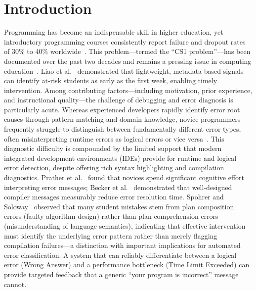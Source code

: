 \documentclass[acmsmall]{acmart}
\begin{document}
\maketitle

\section{Introduction}

Programming has become an indispensable skill in higher education, yet
introductory programming courses consistently report failure and dropout rates
of 30\% to 40\% worldwide~\cite{bennedsen2007failure,watson2014failure}. This
problem---termed the ``CS1 problem''---has been
documented over the past two decades and remains a pressing
issue in computing education~\cite{pears2007survey,liao2016lightweight}. Liao et al.~\cite{liao2016lightweight} demonstrated that lightweight, metadata-based
signals can identify at-risk students as early as the first week, enabling timely intervention. Among contributing
factors---including motivation, prior experience,
and instructional quality---the challenge of debugging and error diagnosis is
particularly acute. Whereas experienced developers rapidly identify
error root causes through pattern matching and domain knowledge, novice
programmers frequently struggle to distinguish between fundamentally different
error types, often misinterpreting runtime errors as logical errors or vice
versa~. This diagnostic difficulty is compounded by
the limited support that modern integrated development environments (IDEs)
provide for runtime and logical error detection, despite offering rich
syntax highlighting and compilation diagnostics. Prather et al.~\cite{prather2017novices} found that novices spend significant cognitive effort
interpreting error messages; Becker et al.~\cite{becker2016compiler} demonstrated that
well-designed compiler messages measurably reduce error resolution time. Spohrer and Soloway~\cite{spohrer1986novice} observed that many student
mistakes stem from plan composition errors (faulty algorithm design) rather
than plan comprehension errors (misunderstanding of language semantics),
indicating that effective intervention must identify the underlying
error pattern rather than merely flagging compilation failures---a distinction
with important implications for automated error classification.
A system that can reliably differentiate between a logical error (Wrong
Answer) and a performance bottleneck (Time Limit Exceeded) can provide
targeted feedback that a generic ``your program is incorrect'' message cannot.
\end{document}

